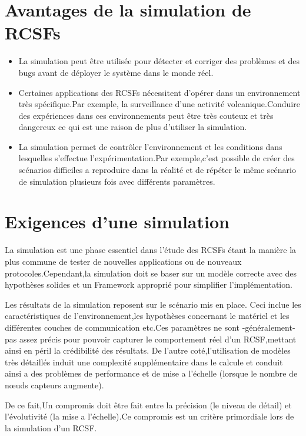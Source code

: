 \section{Avantages de la simulation de RCSFs}
\begin{itemize}

\item La simulation peut être utilisée pour détecter et corriger des problèmes et des bugs avant de  déployer le système dans le monde réel.
\item Certaines applications des RCSFs nécessitent d'opérer dans un environnement très spécifique.Par exemple, la surveillance d'une activité volcanique.Conduire des expériences dans ces environnements peut être très couteux et très dangereux ce qui est une raison de plus d'utiliser la simulation.
\item La simulation permet de contrôler l'environnement et les conditions dans lesquelles s'effectue l'expérimentation.Par exemple,c'est possible de créer des scénarios difficiles a reproduire dans la réalité    et de répéter le même scénario de simulation plusieurs fois avec différents paramètres.   

\end{itemize}
\section{Exigences d'une simulation}
La simulation est une phase essentiel dans l'étude des RCSFs étant la manière la plus commune de tester de nouvelles applications ou de nouveaux protocoles.Cependant,la simulation doit se baser sur  un modèle correcte avec des hypothèses solides et un Framework approprié pour simplifier l'implémentation.

Les résultats de la simulation reposent sur le scénario mis en place. Ceci inclue les caractéristiques de l'environnement,les hypothèses concernant le matériel et les différentes couches de communication etc.Ces paramètres ne sont -généralement- pas assez précis  pour pouvoir capturer le comportement réel d'un RCSF,mettant ainsi en péril la crédibilité des résultats.
De l'autre coté,l'utilisation de modèles très détaillés induit une complexité supplémentaire dans le calcule et conduit ainsi a des  problèmes de performance et de mise a l'échelle (lorsque le nombre de nœuds capteurs augmente).

De ce fait,Un compromis doit être fait entre la précision (le niveau de détail) et l'évolutivité (la mise a l'échelle).Ce compromis est un critère primordiale lors de la simulation d'un RCSF.

